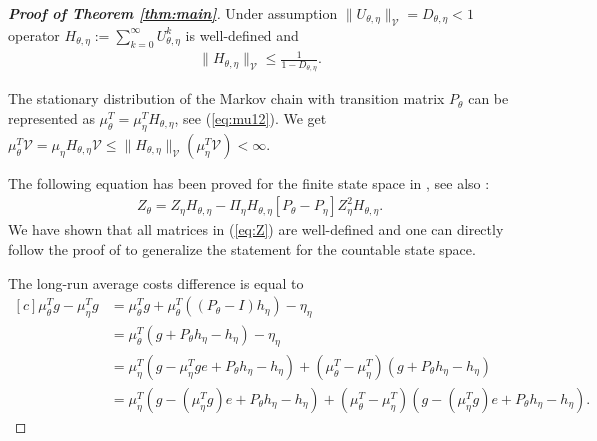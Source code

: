 \documentclass[11pt]{article}
\newcommand{\V}{\mathcal{V}}
\theoremstyle{definition}
\numberwithin{equation}{section}
\begin{document}
\begin{proof}[\textbf{Proof of Theorem \ref{thm:main}}]
 Under assumption $\|U_{\theta, \eta}\|_\V = D_{\theta, \eta} <1$  operator $H_{\theta, \eta}:=\sum\limits_{k=0}^{\infty}U^k_{\theta, \eta} $ is well-defined and
 \begin{align}\label{eq:normH}
 \|H_{\theta, \eta}\|_\V\leq \frac{1}{1 - D_{\theta, \eta}}.
 \end{align}


The stationary distribution of the Markov chain with transition matrix $P_\theta$ can be represented as  $\mu_\theta^T = \mu_{\eta}^T H_{\theta, \eta}$, see   (\ref{eq:mu12}).  We get $\mu_\theta^T\V = \mu_\eta H_{\theta, \eta}\V\leq\|H_{\theta, \eta}\|_\V^{ } (\mu_\eta^T \V)<\infty.$







The following equation has been proved for the finite state space in \cite[Theorem 2]{Schweitzer1968}, see also \cite{Glynn1996}:
\begin{align}\label{eq:Z}
Z_\theta = Z_{\eta}H_{\theta, \eta} - \Pi_{\eta} H_{\theta, \eta}[P_\theta - P_{\eta}]Z^2_{\eta}H_{\theta, \eta}.
\end{align}
We have shown that all matrices in (\ref{eq:Z}) are well-defined and one can directly follow the proof of \cite[Theorem 2]{Schweitzer1968} to generalize the statement for the countable state space.


The long-run average costs difference is equal to
\begin{equation*}
\begin{aligned}[c]
\mu_\theta^Tg - \mu_\eta^Tg &= \mu_\theta^Tg+ \mu_{\theta}^T\left( (P_\theta-I)h_{\eta} \right)- \eta_{\eta} \\
&=\mu_{\theta}^T(g + P_\theta h_{\eta}  - h_{\eta} ) -\eta_{\eta}\\
&=\mu_{\eta}^T(g  - \mu_\eta^Tg  e + P_\theta h_{\eta}  -h_{\eta}) + (\mu_{\theta}^T - \mu_{\eta}^T)(g+P_\theta h_{\eta}  - h_{\eta} )\\
& = \mu_{\eta}^T(g  -(\mu_\eta^Tg)  e + P_\theta h_{\eta}  -h_{\eta}) + (\mu_{\theta}^T - \mu_{\eta}^T)(g - (\mu_\eta^Tg ) e +P_\theta h_{\eta}  - h_{\eta} ).
\end{aligned}
 \end{equation*}





\end{proof}
\end{document}
